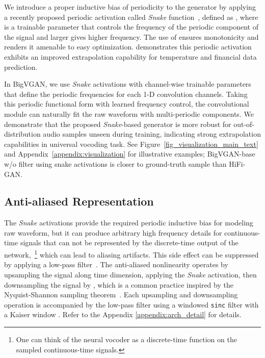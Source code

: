 \documentclass{article} \usepackage{iclr2023_conference,times}
\theoremstyle{plain}
\theoremstyle{definition}
\theoremstyle{remark}
\begin{document}
We introduce a proper inductive bias of periodicity to the generator by applying a recently proposed periodic activation called \emph{Snake} function~\citep{liu2020neural}, defined as , where  is a trainable parameter that controls the frequency of the periodic component of the signal and larger  gives higher frequency. The use of  ensures monotonicity and renders it amenable to easy optimization. 
\citet{liu2020neural} demonstrates this periodic activation exhibits an improved extrapolation capability for temperature and financial data prediction.

In BigVGAN, we use \emph{Snake} activations  with channel-wise trainable parameters  that define the periodic frequencies for each 1-D convolution channels.
Taking this periodic functional form with learned frequency control, the convolutional module can naturally fit the raw waveform with multi-periodic components.
We demonstrate that the proposed \emph{Snake}-based generator is more robust for out-of-distribution audio samples unseen during training, indicating strong extrapolation capabilities in universal vocoding task.
See Figure~\ref{fig_visualization_main_text} and Appendix~\ref{appendix:visualization} for illustrative examples; BigVGAN-base w/o filter using snake activations is closer to ground-truth sample than HiFi-GAN.

\vspace{-.2cm}
\subsection{Anti-aliased Representation}
\vspace{-.2cm}


The \emph{Snake} activations provide the required periodic inductive bias for modeling raw waveform, but it can produce arbitrary high frequency details for continuous-time signals that can not be represented by the discrete-time output of the network,~\footnote{One can think of the neural vocoder as a discrete-time function on the sampled continuous-time signals.} which can lead to aliasing artifacts.
This side effect can be suppressed by applying a low-pass filter~\citep[e.g.,][]{karras2021alias}. The anti-aliased nonlinearity operates by upsampling the signal  along time dimension, applying the \emph{Snake} activation, then downsampling the signal by , which is a common practice inspired by the Nyquist-Shannon sampling theorem~\citep{shannon1949communication}. Each upsampling and downsampling operation is accompanied by the low-pass filter using a windowed \texttt{sinc} filter with a Kaiser window \citep{dsp}. Refer to the Appendix \ref{appendix:arch_detail} for details.
\end{document}
